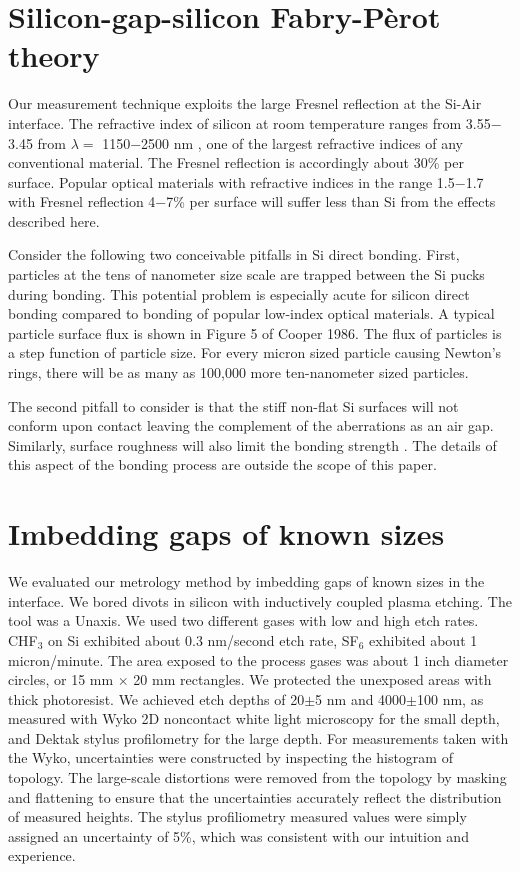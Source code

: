 \documentclass[osajnl,preprint,showpacs,superscriptaddress,12pt]{revtex4-1} %
\begin{document}
\section{Silicon-gap-silicon Fabry-P\`{e}rot theory}


Our measurement technique exploits the large Fresnel reflection \cite{2001opt4.book.....H} at the Si-Air interface.  The refractive index of silicon at room temperature ranges from 3.55$-$3.45 from $\lambda = $ 1150$-$2500 nm \cite{2006SPIE.6273E..77F}, one of the largest refractive indices of any conventional material.  The Fresnel reflection is accordingly about 30\% per surface.  Popular optical materials with refractive indices in the range 1.5$-$1.7 with Fresnel reflection 4$-$7\% per surface will suffer less than Si from the effects described here.


Consider the following two conceivable pitfalls in Si direct bonding.  First, particles at the tens of nanometer size scale are trapped between the Si pucks during bonding.  This potential problem is especially acute for silicon direct bonding compared to bonding of popular low-index optical materials.  A typical particle surface flux is shown in Figure 5 of Cooper 1986\cite{Cooper_1986}.  The flux of particles is a step function of particle size.  For every micron sized particle causing Newton's rings, there will be as many as 100,000 more ten-nanometer sized particles.


The second pitfall to consider is that the stiff non-flat Si surfaces will not conform upon contact leaving the complement of the aberrations as an air gap. Similarly, surface roughness will also limit the bonding strength  \cite{JJAP.37.4197,2001JOptA...3...85G}.  The details of this aspect of the bonding process are outside the scope of this paper.  

\section{Imbedding gaps of known sizes}
We evaluated our metrology method by imbedding gaps of known sizes in the interface.  We bored divots in silicon with inductively coupled plasma etching.  The tool was a Unaxis.  We used two different gases with low and high etch rates.  CHF$_3$ on Si exhibited about 0.3 nm/second etch rate, SF$_6$ exhibited about 1 micron/minute.  The area exposed to the process gases was about 1 inch diameter circles, or 15 mm $\times$ 20 mm rectangles.  We protected the unexposed areas with thick photoresist.  We achieved etch depths of 20$\pm$5 nm and 4000$\pm$100 nm, as measured with Wyko 2D noncontact white light microscopy for the small depth, and Dektak stylus profilometry for the large depth.  For measurements taken with the Wyko, uncertainties were constructed by inspecting the histogram of topology.  The large-scale distortions were removed from the topology by masking and flattening to ensure that the uncertainties accurately reflect the distribution of measured heights.  The stylus profiliometry measured values were simply assigned an uncertainty of 5\%, which was consistent with our intuition and experience.  
\end{document}
